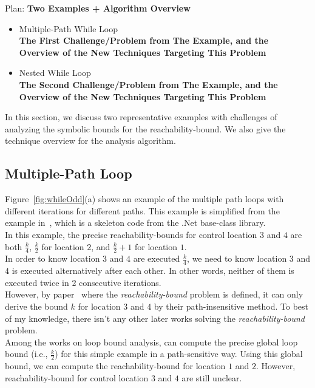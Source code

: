 Plan:
\textbf{Two Examples + Algorithm Overview}
\begin{itemize}
\item {Multiple-Path While Loop}
\\
\textbf{The First Challenge/Problem from The Example, 
and the Overview of the New Techniques Targeting This Problem}
\item {Nested While Loop}
\\
\textbf{The Second Challenge/Problem from The Example,
and the Overview of the New Techniques Targeting This Problem}
\end{itemize}
In this section, we discuss two representative examples with
challenges of analyzing the symbolic bounds for the reachability-bound.
We also give the technique overview for the analysis algorithm.
%
\subsection{Multiple-Path Loop}
\label{sec:overview-multiplepath}

Figure~\ref{fig:whileOdd}(a) shows an example of the multiple path loops
with different iterations for different paths.
This example is simplified from the example in~\cite{Sumit2010rechability}, which
is a skeleton code from the .Net base-class library.
\\
In this example,
the precise reachability-bounds for control location $3$ and $4$ are both $\frac{k}{4}$,
$\frac{k}{2}$ for location $2$, and $\frac{k}{2} + 1$ for location $1$.
\\
In order to know location $3$ and $4$ are executed $\frac{k}{4}$,
we need to know location $3$ and $4$ is executed alternatively after each other.
In other words, neither of them is executed twice in 2 consecutive iterations.
\\
However, by paper~\cite{Sumit2010rechability} where the \emph{reachability-bound} problem is defined,
it can only derive the bound $k$ for location $3$ and $4$ by their path-insensitive method.
To best of my knowledge, there isn't any other later works solving the \emph{reachability-bound} problem.
\\
Among the works on loop bound analysis, \cite{GulwaniJK09} can compute the precise global
loop bound (i.e., $\frac{k}{2}$) for this simple example in a path-sensitive way.
Using this global bound, we can compute the reachability-bound for location $1$ and $2$.
However, reachability-bound for control location $3$ and $4$ are still unclear.
